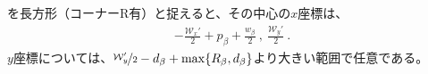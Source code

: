 \clearpage
\EndFaceBoring を長方形（コーナーR有）と捉えると、その中心の$x$座標は、
\begin{align*}
  -\frac{\mathcal W_x'}2+p_\beta+\frac{w_\beta}2~,~\frac{\mathcal W_y'}2\ .
\end{align*}
$y$座標については、$\nicefrac{\mathcal W_y'}2-d_\beta+\max\{R_\beta, d_\beta\}$より大きい範囲で任意である。